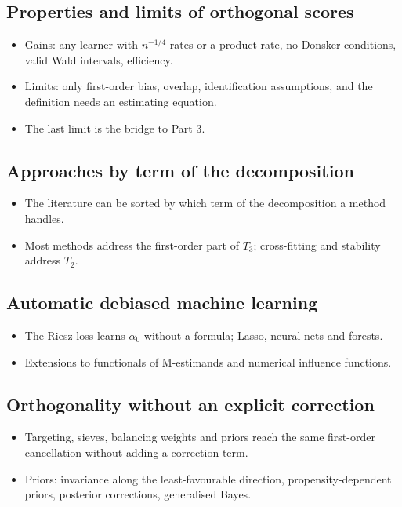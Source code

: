 \documentclass[11pt]{article}
\begin{document}
\subsection*{Properties and limits of orthogonal scores}
\begin{itemize}
\item Gains: any learner with $n^{-1/4}$ rates or a product rate, no Donsker conditions, valid Wald intervals, efficiency.
\item Limits: only first-order bias, overlap, identification assumptions, and the definition needs an estimating equation.
\item The last limit is the bridge to Part 3.
\end{itemize}

\subsection*{Approaches by term of the decomposition}
\begin{itemize}
\item The literature can be sorted by which term of the decomposition a method handles.
\item Most methods address the first-order part of $T_3$; cross-fitting and stability address $T_2$.
\end{itemize}

\subsection*{Automatic debiased machine learning}
\begin{itemize}
\item The Riesz loss learns $\alpha_0$ without a formula; Lasso, neural nets and forests.
\item Extensions to functionals of M-estimands and numerical influence functions.
\end{itemize}

\subsection*{Orthogonality without an explicit correction}
\begin{itemize}
\item Targeting, sieves, balancing weights and priors reach the same first-order cancellation without adding a correction term.
\item Priors: invariance along the least-favourable direction, propensity-dependent priors, posterior corrections, generalised Bayes.
\end{itemize}
\end{document}
